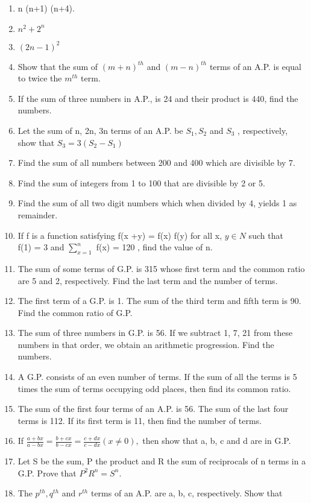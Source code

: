 \begin{enumerate}[label=\arabic*.,ref=\thesubsection.\theenumi]
\item n (n+1) (n+4).
\item $n^2 + 2^n$
\item $(2 n - 1)^2$
\item Show that the sum of $(m + n)^{th}$ and $(m - n)^{th}$ terms of an A.P. is equal to twice the $m^{th}$ term.
\item If the sum of three numbers in A.P., is 24 and their product is 440, find the numbers.
\item Let the sum of n, 2n, 3n terms of an A.P. be $S_1, S_2$ and $S_3$ , respectively, show that 
$S_3 = 3(S_2 - S_1)$
\item Find the sum of all numbers between 200 and 400 which are divisible by 7.
\item Find the sum of integers from 1 to 100 that are divisible by 2 or 5.
\item Find the sum of all two digit numbers which when divided by 4, yields 1 as remainder.
\item If f is a function satisfying f(x +y) = f(x) f(y) for all x, $y \in N$ such that \\
f(1) = 3 and $\sum_{x = 1}^n$ f(x) = 120 , find the value of n.
\item The sum of some terms of G.P. is 315 whose first term and the common ratio are 5 and 2, respectively. Find the last term and the number of terms.
\item  The first term of a G.P. is 1. The sum of the third term and fifth term is 90. Find the common ratio of G.P.
\item The sum of three numbers in G.P. is 56. If we subtract 1, 7, 21 from these numbers in that order, we obtain an arithmetic progression. Find the numbers.
\item A G.P. consists of an even number of terms. If the sum of all the terms is 5 times the sum of terms occupying odd places, then find its common ratio.
\item  The sum of the first four terms of an A.P. is 56. The sum of the last four terms is 112. If its first term is 11, then find the number of terms.
\item If $\frac{a+bx}{a-bx} = \frac{b+cx}{b-cx} = \frac{c+dx}{c-dx}(x \neq 0),$ then show that a, b, c and d are in G.P. 
\item Let S be the sum, P the product and R the sum of reciprocals of n terms in a G.P. Prove that $P^2R^n = S^n.$ 
\item The $p^{th}, q^{th}$ and $r^{th}$ terms of an A.P. are a, b, c, respectively. Show that 

\end{enumerate}
